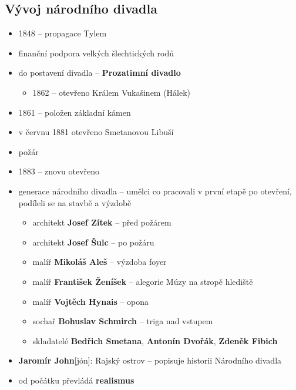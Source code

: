 \subsection{Vývoj národního divadla}
\begin{itemize}
\item 1848 -- propagace Tylem
\item finanční podpora velkých šlechtických rodů 
\item do postavení divadla -- \textbf{Prozatimní divadlo}
	\begin{itemize}
	\item 1862 -- otevřeno Králem Vukašinem (Hálek)
	\end{itemize}
\item 1861 -- položen základní kámen
\item v červnu 1881 otevřeno Smetanovou Libuší 
\item požár
\item 1883 -- znovu otevřeno
\item generace národního divadla -- umělci co pracovali v první etapě po otevření, podíleli se na stavbě a výzdobě
	\begin{itemize}
	\item architekt \textbf{Josef Zítek} -- před požárem
	\item architekt \textbf{Josef Šulc} -- po požáru
	\item malíř \textbf{Mikoláš Aleš} -- výzdoba foyer
	\item malíř \textbf{František Ženíšek} -- alegorie Múzy na stropě hlediště
	\item malíř \textbf{Vojtěch Hynais} -- opona
	\item sochař \textbf{Bohuslav Schmirch} -- triga nad vstupem 
	\item skladatelé \textbf{Bedřich Smetana}, \textbf{Antonín Dvořák}, \textbf{Zdeněk Fibich}
	\end{itemize}
\item \textbf{Jaromír John}[jón]: Rajský ostrov -- popisuje historii Národního divadla
\item od počátku převládá \textbf{realismus}
\end{itemize}

